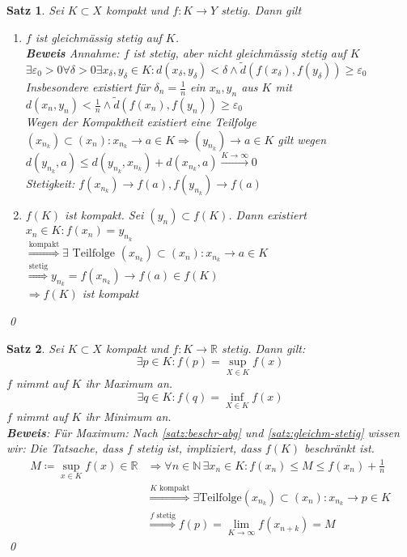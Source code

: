 \documentclass[ngerman,titlepage,twoside, parskip=half*]{scrreprt}
\newcommand*{\N}{\mathbb{N}}
\newcommand*{\R}{\mathbb{R}}
\theoremstyle{plain}
\newtheorem{theorem}{Satz}[section]
\theoremstyle{definition}
\theoremstyle{remark}
\begin{document}
\begin{theorem}
\label{satz:gleichm-stetig}
Sei $K\subset X$ kompakt und $f\colon K\rightarrow Y$ stetig. Dann gilt
\begin{enumerate}[(1)]
  \item $f$ ist gleichmässig stetig auf $K$.\\
    \textbf{Beweis} Annahme: $f$ ist stetig, aber nicht gleichmässig stetig auf $K$\\
    $\exists \varepsilon_0>0 \forall \delta >0 \exists x_{\delta},y_{\delta}\in K\colon d(x_{\delta},
    y_{\delta})<\delta\wedge\tilde{d}(f(x_{\delta}),f(y_{\delta}))\geq \varepsilon_0$\\
    Insbesondere existiert für $\delta_n=\frac{1}{n}$ ein $x_n,y_n$ aus $K$ mit \\
    $d(x_n,y_n)<\frac{1}{n}
    \wedge \tilde{d}(f(x_n),f(y_n))\geq \varepsilon_0$\\
    Wegen der Kompaktheit existiert eine Teilfolge $(x_{n_k})\subset (x_n)\colon x_{n_k}\rightarrow a\in K
    \Rightarrow (y_{n_k})\rightarrow a\in K$ gilt wegen $d(y_{n_k},a)\leq d(y_{n_k},x_{n_k})+d(x_{n_k},a)
    \stackrel{K\rightarrow\infty}{\rightarrow}0$\\
    Stetigkeit: $f(x_{n_k})\rightarrow f(a), f(y_{n_k})\rightarrow f(a)$\textnormal{\lightning}
  \item $f(K)$  ist kompakt.
    Sei $(y_n)\subset f(K)$. Dann existiert $x_n \in K\colon f(x_n)=y_{n_k}$\\
    $\stackrel{\text{kompakt}}{\Rightarrow} \exists \text{ Teilfolge } (x_{n_k})\subset (x_n)\colon x_{n_k}\rightarrow
    a \in K$\\
    $\stackrel{\text{stetig}}{\Rightarrow} y_{n_k}=f(x_{n_k})\rightarrow f(a) \in f(K)$\\
    $\Rightarrow f(K)$ ist kompakt
\end{enumerate}
\qed
\end{theorem}

\begin{theorem}
\label{satz:max-fkt}
Sei $K\subset X$ kompakt und $f\colon K\rightarrow\R$ stetig. Dann gilt:
\[\exists p \in K\colon f(p)=\sup_{X\in K}f(x)\]
$f$ nimmt auf $K$ ihr Maximum an.
\[\exists q \in K\colon f(q)=\inf_{X\in K}f(x)\]
$f$ nimmt auf $K$ ihr Minimum an.\\
\textbf{Beweis}: Für Maximum: Nach \autoref{satz:beschr-abg} und \autoref{satz:gleichm-stetig} wissen wir: Die Tatsache, dass
$f$ stetig ist, impliziert, dass $f(K)$ beschränkt ist.
\begin{align*}
  M\coloneqq\sup_{x\in K} f(x)\in\R & \Rightarrow \forall n \in \N\,\exists x_n\in K\colon f(x_n)\leq M\leq f(x_n)+\frac{1}{n}\\
  & \stackrel{K\text{~kompakt}}{\Rightarrow} \exists \text{Teilfolge} (x_{n_k})\subset (x_n)\colon x_{n_k}\rightarrow p\in K\\
  & \stackrel{f\text{~stetig}}{\Rightarrow} f(p)=\lim_{K\rightarrow \infty} f(x_{n+k})=M
\end{align*}
\qed
\end{theorem}
\end{document}
